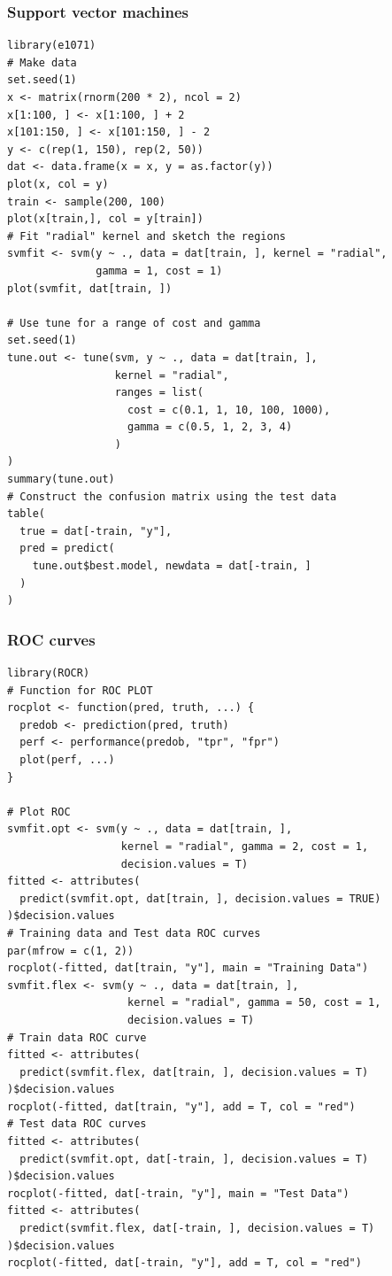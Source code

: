 \documentclass[11pt]{article}
\begin{document}
\subsubsection{Support vector machines}
\begin{lstlisting}
library(e1071)
# Make data
set.seed(1)
x <- matrix(rnorm(200 * 2), ncol = 2)
x[1:100, ] <- x[1:100, ] + 2
x[101:150, ] <- x[101:150, ] - 2
y <- c(rep(1, 150), rep(2, 50))
dat <- data.frame(x = x, y = as.factor(y))
plot(x, col = y)
train <- sample(200, 100)
plot(x[train,], col = y[train])
# Fit "radial" kernel and sketch the regions
svmfit <- svm(y ~ ., data = dat[train, ], kernel = "radial",  
              gamma = 1, cost = 1)
plot(svmfit, dat[train, ])

# Use tune for a range of cost and gamma
set.seed(1)
tune.out <- tune(svm, y ~ ., data = dat[train, ], 
                 kernel = "radial", 
                 ranges = list(
                   cost = c(0.1, 1, 10, 100, 1000),
                   gamma = c(0.5, 1, 2, 3, 4)
                 )
)
summary(tune.out)
# Construct the confusion matrix using the test data
table(
  true = dat[-train, "y"], 
  pred = predict(
    tune.out$best.model, newdata = dat[-train, ]
  )
)
\end{lstlisting}

\subsubsection{ROC curves}
\begin{lstlisting}
library(ROCR)
# Function for ROC PLOT
rocplot <- function(pred, truth, ...) {
  predob <- prediction(pred, truth)
  perf <- performance(predob, "tpr", "fpr")
  plot(perf, ...)
}

# Plot ROC
svmfit.opt <- svm(y ~ ., data = dat[train, ], 
                  kernel = "radial", gamma = 2, cost = 1, 
                  decision.values = T)
fitted <- attributes(
  predict(svmfit.opt, dat[train, ], decision.values = TRUE)
)$decision.values
# Training data and Test data ROC curves
par(mfrow = c(1, 2))
rocplot(-fitted, dat[train, "y"], main = "Training Data")
svmfit.flex <- svm(y ~ ., data = dat[train, ], 
                   kernel = "radial", gamma = 50, cost = 1, 
                   decision.values = T)
# Train data ROC curve
fitted <- attributes(
  predict(svmfit.flex, dat[train, ], decision.values = T)
)$decision.values
rocplot(-fitted, dat[train, "y"], add = T, col = "red")
# Test data ROC curves
fitted <- attributes(
  predict(svmfit.opt, dat[-train, ], decision.values = T)
)$decision.values
rocplot(-fitted, dat[-train, "y"], main = "Test Data")
fitted <- attributes(
  predict(svmfit.flex, dat[-train, ], decision.values = T)
)$decision.values
rocplot(-fitted, dat[-train, "y"], add = T, col = "red")
\end{lstlisting}
\end{document}
